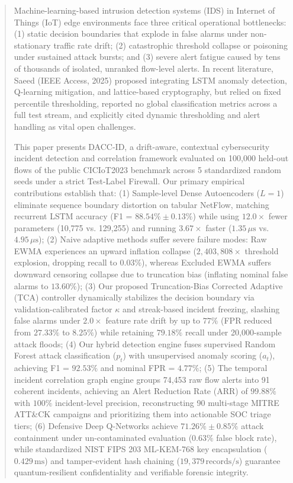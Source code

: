 \documentclass{ieeeaccess}
\begin{document}
\begin{abstract}
Machine-learning-based intrusion detection systems (IDS) in Internet of Things (IoT) edge environments face three critical operational bottlenecks: (1) static decision boundaries that explode in false alarms under non-stationary traffic rate drift; (2) catastrophic threshold collapse or poisoning under sustained attack bursts; and (3) severe alert fatigue caused by tens of thousands of isolated, unranked flow-level alerts. In recent literature, Saeed (IEEE Access, 2025) proposed integrating LSTM anomaly detection, Q-learning mitigation, and lattice-based cryptography, but relied on fixed percentile thresholding, reported no global classification metrics across a full test stream, and explicitly cited dynamic thresholding and alert handling as vital open challenges. 

This paper presents DACC-ID, a drift-aware, contextual cybersecurity incident detection and correlation framework evaluated on 100,000 held-out flows of the public CICIoT2023 benchmark across 5 standardized random seeds under a strict Test-Label Firewall. Our primary empirical contributions establish that:
(1) Sample-level Dense Autoencoders ($L=1$) eliminate sequence boundary distortion on tabular NetFlow, matching recurrent LSTM accuracy (F1 = $88.54\% \pm 0.13\%$) while using $12.0\times$ fewer parameters (10,775 vs. 129,255) and running $3.67\times$ faster ($1.35\,\mu\text{s}$ vs. $4.95\,\mu\text{s}$);
(2) Naive adaptive methods suffer severe failure modes: Raw EWMA experiences an upward inflation collapse ($2,403,808\times$ threshold explosion, dropping recall to $0.03\%$), whereas Excluded EWMA suffers downward censoring collapse due to truncation bias (inflating nominal false alarms to $13.60\%$);
(3) Our proposed Truncation-Bias Corrected Adaptive (TCA) controller dynamically stabilizes the decision boundary via validation-calibrated factor $\kappa$ and streak-based incident freezing, slashing false alarms under $2.0\times$ feature rate drift by up to $77\%$ (FPR reduced from $27.33\%$ to $8.25\%$) while retaining $79.18\%$ recall under 20,000-sample attack floods;
(4) Our hybrid detection engine fuses supervised Random Forest attack classification ($p_t$) with unsupervised anomaly scoring ($a_t$), achieving F1 = $92.53\%$ and nominal FPR = $4.77\%$;
(5) The temporal incident correlation graph engine groups 74,453 raw flow alerts into 91 coherent incidents, achieving an Alert Reduction Rate (ARR) of $99.88\%$ with $100\%$ incident-level precision, reconstructing 90 multi-stage MITRE ATT\&CK campaigns and prioritizing them into actionable SOC triage tiers;
(6) Defensive Deep Q-Networks achieve $71.26\% \pm 0.85\%$ attack containment under un-contaminated evaluation ($0.63\%$ false block rate), while standardized NIST FIPS 203 ML-KEM-768 key encapsulation ($0.429\,\text{ms}$) and tamper-evident hash chaining ($19,379\,\text{records/s}$) guarantee quantum-resilient confidentiality and verifiable forensic integrity.
\end{abstract}
\end{document}
